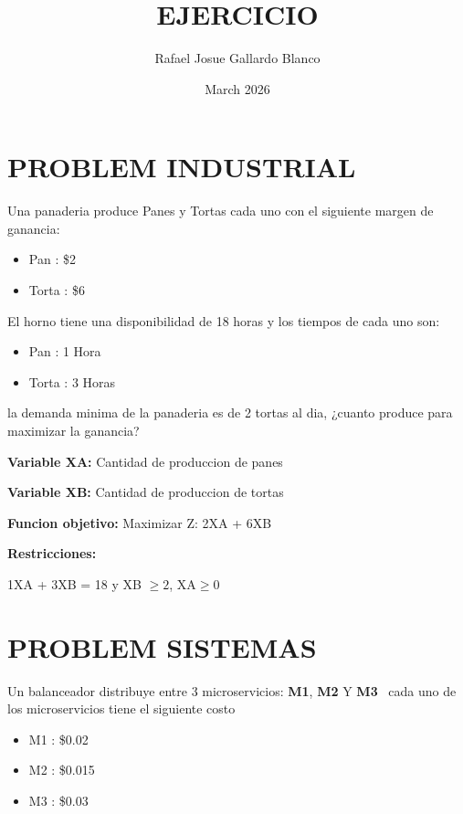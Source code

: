 \documentclass{article}
\title{EJERCICIO}
\author{Rafael Josue Gallardo Blanco}
\date{March 2026}
\begin{document}
\maketitle

\section{PROBLEM INDUSTRIAL}
\large
Una panaderia produce Panes y Tortas cada uno con el siguiente margen de ganancia:

\begin{itemize}
    \item Pan : \$2 
    \item Torta : \$6
\end{itemize}

\large El horno tiene una disponibilidad de 18 horas y los tiempos de cada uno son:

\begin{itemize}
    \item Pan : 1 Hora 
    \item Torta : 3 Horas
\end{itemize}

\large la demanda minima de la panaderia es de 2 tortas al dia, ¿cuanto produce para maximizar la ganancia?

\begin{center}
    \item \textbf{Variable XA:} Cantidad de produccion de panes 
    \item \textbf{Variable XB:} Cantidad de produccion de tortas
    \item \textbf{Funcion objetivo:} Maximizar Z: 2XA + 6XB
    \item \large \textbf{Restricciones:} \item 1XA + 3XB = 18 y XB $ \geq 2$, XA$ \geq 0$
    
\end{center}
\vspace{1cm}
\section{PROBLEM SISTEMAS}
\large
 Un balanceador distribuye entre 3 microservicios: \textbf{M1}, \textbf{M2} Y \textbf{M3}
\ cada uno de los microservicios tiene el siguiente costo

\begin{itemize}
    \item M1 : \$0.02
    \item M2 : \$0.015
    \item M3 : \$0.03
\end{itemize}
\end{document}

